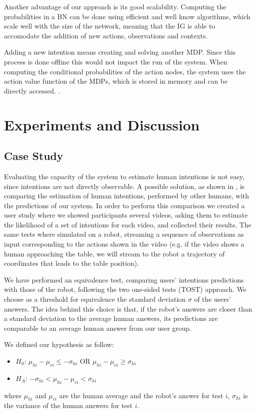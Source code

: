 Another advantage of our approach is its good scalability. Computing the probabilities in a BN can be done using efficient and well know algorithms, which scale well with the size of the network, meaning that the IG is able to accomodate the addition of new actions, observations and contexts. 

Adding a new intention means creating and solving another MDP. Since this process is done offline this would not impact the run of the system. When computing the conditional probabilities of the action nodes, the system uses the action value function of the MDPs, which is stored in memory and can be directly accessed.
.
\section{Experiments and Discussion}
\label{sec:situation_assessment-experiments}
\subsection{Case Study}
Evaluating the capacity of the system to estimate human intentions is not easy, since intentions are not directly observable. A possible solution, as shown in \cite{baker2014modeling}, is comparing the estimation of human intentions, performed by other humans, with the predictions of our system. In order to perform this comparison we created a user study where we showed participants several videos, asking them to estimate the likelihood of a set of intentions  for each video, and collected their results. The same tests where simulated on a robot, streaming a sequence of observations as input corresponding to the actions shown in the video (e.g. if the video shows a human approaching the table, we will stream to the robot a trajectory of coordinates that leads to the table position).

We have performed an equivalence test, comparing users' intentions predictions with those of the robot, following the two one-sided tests (TOST) approach. We choose as a threshold for equivalence the standard deviation $\sigma$ of the users' answers. The idea behind this choice is that, if the robot's answers are closer than a standard deviation to the average human answers, its predictions are comparable to an average human answer from our user group. 

We defined our hypothesis as follow: 
\begin{itemize}
\item $H_0$: $\mu_{hi}-\mu_{ri}\leq-\sigma_{hi}$ OR $\mu_{hi}-\mu_{ri}\geq\sigma_{hi}$ 
\item $H_A$: $-\sigma_{hi}<\mu_{hi}-\mu_{ri}<\sigma_{hi}$  
\end{itemize}
where $\mu_{hi}$ and $\mu_{ri}$ are the human average and the robot's answer for test $i$, $\sigma_{hi}$ is the variance of the human answers for test $i$.

